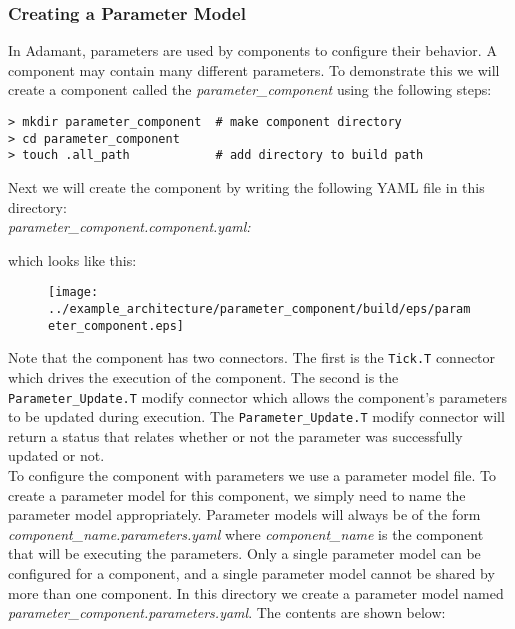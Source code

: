 \subsubsection{Creating a Parameter Model}

In Adamant, parameters are used by components to configure their behavior. A component may contain many different parameters. To demonstrate this we will create a component called the \textit{parameter\_component} using the following steps:

\vspace{5mm} %
\begin{verbatim}
> mkdir parameter_component  # make component directory
> cd parameter_component 
> touch .all_path            # add directory to build path
\end{verbatim}
\vspace{5mm} %

Next we will create the component by writing the following YAML file in this directory: \\

\textit{parameter\_component.component.yaml:}

which looks like this:

\begin{figure}[H]
  \texttt{[image: ../example\_architecture/parameter\_component/build/eps/parameter\_component.eps]}
\end{figure}

Note that the component has two connectors. The first is the \texttt{Tick.T} connector which drives the execution of the component. The second is the \texttt{Parameter\_Update.T} modify connector which allows the component's parameters to be updated during execution. The \texttt{Parameter\_Update.T} modify connector will return a status that relates whether or not the parameter was successfully updated or not. \\

To configure the component with parameters we use a parameter model file. To create a parameter model for this component, we simply need to name the parameter model appropriately. Parameter models will always be of the form \textit{component\_name.parameters.yaml} where \textit{component\_name} is the component that will be executing the parameters. Only a single parameter model can be configured for a component, and a single parameter model cannot be shared by more than one component. In this directory we create a parameter model named \textit{parameter\_component.parameters.yaml}. The contents are shown below: \\

